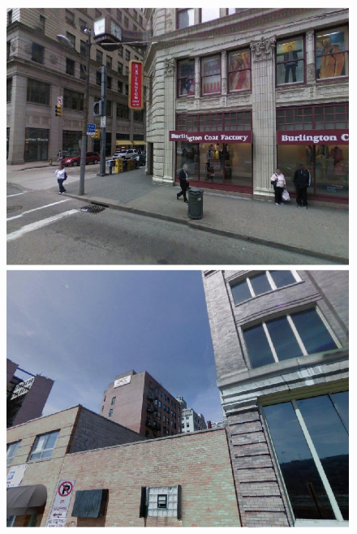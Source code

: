 \begin{figure}[!ht]
{\begin{minipage}{\subw}
{		  }
		\end{minipage}
	 }
	 \colorbox{myRed}{
		\begin{minipage}{\subw}
		  \centerline{
		  \includegraphics[width=1.05\linewidth]{imgs/demo03d.jpg}
		  }
		\end{minipage}
	 }
	 \colorbox{myRed}{
		\begin{minipage}{\subw}
		  \centerline{
		  \includegraphics[width=1.05\linewidth]{imgs/demo04d.jpg}
		  }
		\end{minipage}
	 }
	 \vspace{1mm}
	 \\
	 \colorbox{gray}{
		\begin{minipage}{\subw}

\end{minipage}}
\end{figure}
